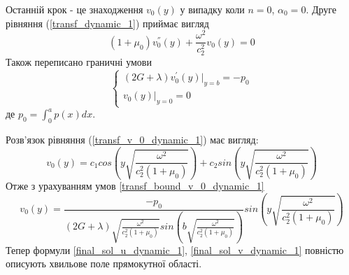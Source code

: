 Останній крок - це знаходження $v_0(y)$ у випадку коли $n=0$, $\alpha_0 =0$.
Друге рівняння (\ref{transf_dynamic_1}) приймає вигляд
\begin{equation}\label{transf_v_0_dynamic_1}
    (1 + \mu_0) v_0^{''}(y) + \frac{\omega^2}{c_2^2}v_0(y) = 0
\end{equation}
Також переписано граничні умови
\begin{equation}\label{transf_bound_v_0_dynamic_1}
    \begin{cases}
        (2G + \lambda)v_0^{'}(y)|_{y=b} = -p_0 \\
        v_0(y)|_{y=0} = 0
    \end{cases}
\end{equation}
де $p_0 = \int_{0}^{a}p(x)dx$.

Розв'язок рівняння (\ref{transf_v_0_dynamic_1}) має вигляд:
\begin{equation}
    v_0(y) = c_1 cos \left(y \sqrt{\frac{\omega^2}{c_2^2(1 + \mu_0)}} \right) + c_2 sin \left( y \sqrt{\frac{\omega^2}{c_2^2(1 + \mu_0)}} \right)
\end{equation}
Отже з урахуванням умов \eqref{transf_bound_v_0_dynamic_1}
\begin{equation}
    v_0(y) = \frac{-p_0}{(2G + \lambda) \sqrt{\frac{\omega^2}{c_2^2(1 + \mu_0)}} sin \left(b \sqrt{\frac{\omega^2}{c_2^2(1 + \mu_0)}} \right) } sin \left(y \sqrt{\frac{\omega^2}{c_2^2(1 + \mu_0)}} \right)
\end{equation}
Тепер формули \eqref{final_sol_u_dynamic_1}, \eqref{final_sol_v_dynamic_1} повністю описують хвильове поле прямокутної області.


